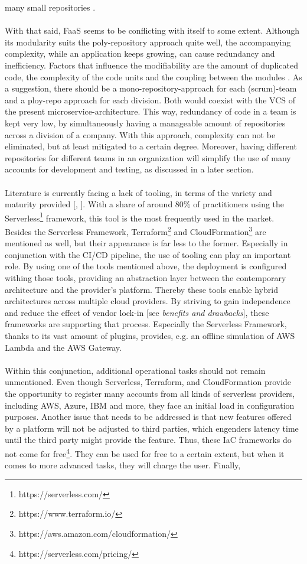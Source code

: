 \documentclass[11pt]{article}
\begin{document}
many small repositories \cite{brousse2019issue}.\\\\ With that said, FaaS seems to be conflicting with itself to some extent. Although its modularity suits the poly-repository approach quite well, the accompanying complexity, while an application keeps growing, can cause redundancy and inefficiency. Factors that inﬂuence the modiﬁability are the amount of duplicated code, the complexity of the code units and the coupling between the modules \cite{racicot2019quality}. As a suggestion, there should be a mono-repository-approach for each (scrum)-team and a ploy-repo approach for each division. Both would coexist with the VCS of the present microservice-architecture. This way, redundancy of code in a team is kept very low, by simultaneously having a manageable amount of repositories across a division of a company. With this approach, complexity can not be eliminated, but at least mitigated to a certain degree. Moreover, having different repositories for different teams in an organization will simplify the use of many accounts for development and testing, as discussed in a later section.\\\\ Literature is currently facing a lack of tooling, in terms of the variety and maturity provided [\cite{Yussupov2019_SystematicMappingStudyFaaS}, \cite{leitner2019mixed}]. With a share of around 80\% \cite{leitner2019mixed} of practitioners using the Serverless\footnote{https://serverless.com/} framework, this tool is the most frequently used in the market. Besides the Serverless Framework, Terraform\footnote{https://www.terraform.io/} and CloudFormation\footnote{https://aws.amazon.com/cloudformation/} are mentioned as well, but their appearance is far less to the former. Especially in conjunction with the CI/CD pipeline, the use of tooling can play an important role. By using one of the tools mentioned above, the deployment is configured withing those tools, providing an abstraction layer between the contemporary architecture and the provider's platform. Thereby these tools enable hybrid architectures across multiple cloud providers. By striving to gain independence and reduce the effect of vendor lock-in [see \textit{benefits and drawbacks}], these frameworks are supporting that process. Especially the Serverless Framework, thanks to its vast amount of plugins, provides, e.g. an offline simulation of AWS Lambda and the AWS Gateway.\\\\ Within this conjunction, additional operational tasks should not remain unmentioned. Even though Serverless, Terraform, and CloudFormation provide the opportunity to register many accounts from all kinds of serverless providers, including AWS, Azure, IBM and more, they face an initial load in configuration purposes. Another issue that needs to be addressed is that new features offered by a platform will not be adjusted to third parties, which engenders latency time until the third party might provide the feature. Thus, these IaC frameworks do not come for free\footnote{https://serverless.com/pricing/}. They can be used for free to a certain extent, but when it comes to more advanced tasks, they will charge the user. Finally, 
\end{document}
